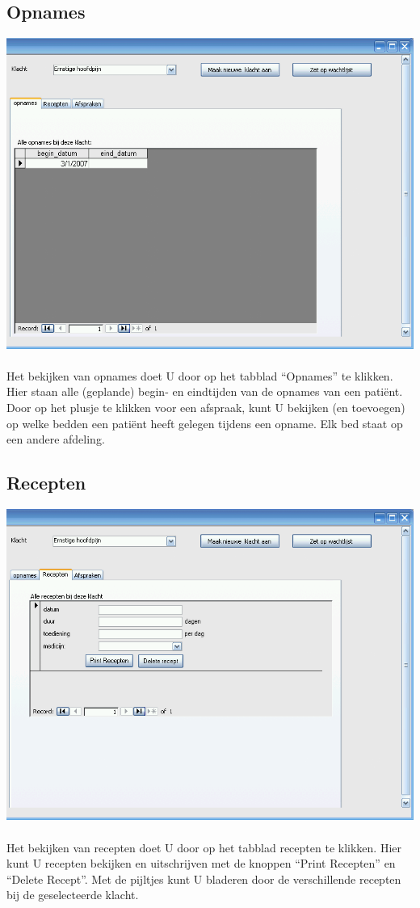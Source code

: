\subsection{Opnames} \label{sec:opnames}
	\includegraphics[scale=.5,angle=0]{patient2}\\
  \\
	Het bekijken van opnames doet U door op het tabblad ``Opnames''
        te klikken. Hier staan alle (geplande) begin- en eindtijden van de
	opnames van een pati\"ent. Door op het plusje te klikken voor een
	afspraak, kunt U bekijken (en toevoegen) op welke bedden een pati\"ent
	heeft gelegen tijdens een opname. Elk bed staat op een andere afdeling.


\subsection{Recepten} \label{sec:recepten}
	\includegraphics[scale=.5,angle=0]{patient3}\\
  \\
	Het bekijken van recepten doet U door op het tabblad recepten
        te klikken. Hier kunt U recepten bekijken en uitschrijven met de knoppen
	``Print Recepten'' en ``Delete Recept''. Met de pijltjes
	kunt U bladeren door de verschillende recepten bij de geselecteerde klacht.
	
